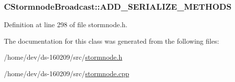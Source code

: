 \subsubsection[{A\+D\+D\+\_\+\+S\+E\+R\+I\+A\+L\+I\+Z\+E\+\_\+\+M\+E\+T\+H\+O\+D\+S}]{\setlength{\rightskip}{0pt plus 5cm}C\+Stormnode\+Broadcast\+::\+A\+D\+D\+\_\+\+S\+E\+R\+I\+A\+L\+I\+Z\+E\+\_\+\+M\+E\+T\+H\+O\+D\+S}\label{class_c_stormnode_broadcast_a0670b7d1f8b38ad2c3b6bd98e6504f1c}


Definition at line 298 of file stormnode.\+h.



The documentation for this class was generated from the following files\+:\begin{DoxyCompactItemize}
\item 
/home/dev/ds-\/160209/src/\hyperlink{stormnode_8h}{stormnode.\+h}\item 
/home/dev/ds-\/160209/src/\hyperlink{stormnode_8cpp}{stormnode.\+cpp}\end{DoxyCompactItemize}
